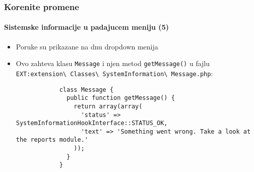 \begin{frame}[fragile]
	\frametitle{Korenite promene}
	\framesubtitle{Sistemske informacije u padajucem meniju (5)}

	\lstset{basicstyle=\tiny\ttfamily}

	\begin{itemize}

		\item Poruke su prikazane na dnu dropdown menija
		
		\item Ovo zahteva klasu \texttt{Message} i njen metod \texttt{getMessage()} u fajlu
			\small
				\texttt{EXT:extension\textbackslash
					Classes\textbackslash
					SystemInformation\textbackslash
					Message.php}:
			\normalsize

		\begin{lstlisting}
			class Message {
			  public function getMessage() {
			    return array(array(
			      'status' => SystemInformationHookInterface::STATUS_OK,
			      'text' => 'Something went wrong. Take a look at the reports module.'
			    ));
			  }
			}
		\end{lstlisting}

	\end{itemize}

\end{frame}


